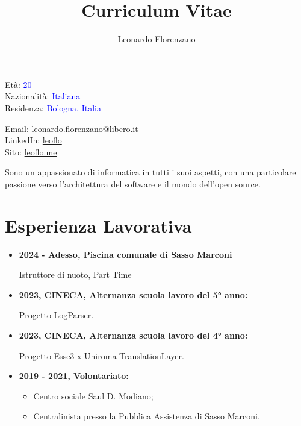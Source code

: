 \documentclass{paper}
\title{Curriculum Vitae}
\author{Leonardo Florenzano}
\begin{document}
\maketitle

\begin{multicols}{2}

\noindent
Età: \textcolor{blue}{20}\\
Nazionalità: \textcolor{blue}{Italiana}\\
Residenza: \textcolor{blue}{Bologna, Italia}

\columnbreak

\noindent
Email: \href{mailto:leonardo.florenzano@libero.it}{leonardo.florenzano@libero.it}\\
LinkedIn: \href{https://www.linkedin.com/in/leoflo}{leoflo}\\
Sito: \href{https://leoflo.me}{leoflo.me}

\end{multicols}

\noindent
Sono un appassionato di informatica in tutti i suoi aspetti, con una particolare passione verso l'architettura del software e il mondo dell'open source.

\section{Esperienza Lavorativa}

\begin{itemize}
    \item \textbf{2024 - Adesso, Piscina comunale di Sasso Marconi}
    
    Istruttore di nuoto, Part Time

    \item \textbf{2023, CINECA, Alternanza scuola lavoro del 5° anno:}
    
    Progetto LogParser.

    \item \textbf{2023, CINECA, Alternanza scuola lavoro del 4° anno:}
    
    Progetto Esse3 x Uniroma TranslationLayer.

    \item \textbf{2019 - 2021, Volontariato:}
    
    \begin{itemize}
        \item Centro sociale Saul D. Modiano;
        \item Centralinista presso la Pubblica Assistenza di Sasso Marconi.
    \end{itemize}
\end{itemize}
\end{document}
